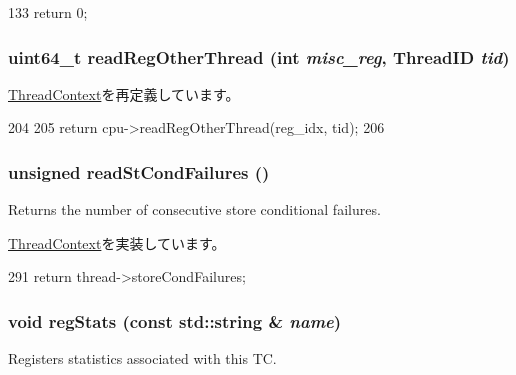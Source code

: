 \begin{DoxyCode}
133     { return 0; }
\end{DoxyCode}
\hypertarget{classInOrderThreadContext_a207d863e4bad4245020ea32adbaf625a}{
\subsubsection[{readRegOtherThread}]{\setlength{\rightskip}{0pt plus 5cm}uint64\_\-t readRegOtherThread (int {\em misc\_\-reg}, \/  {\bf ThreadID} {\em tid})}}
\label{classInOrderThreadContext_a207d863e4bad4245020ea32adbaf625a}


\hyperlink{classThreadContext_afcd73144c45c9fd2f36d55ea4c491505}{ThreadContext}を再定義しています。


\begin{DoxyCode}
204 {
205     return cpu->readRegOtherThread(reg_idx, tid);
206 }
\end{DoxyCode}
\hypertarget{classInOrderThreadContext_a25b995a791e41965e088d8bf3f2bf859}{
\subsubsection[{readStCondFailures}]{\setlength{\rightskip}{0pt plus 5cm}unsigned readStCondFailures ()}}
\label{classInOrderThreadContext_a25b995a791e41965e088d8bf3f2bf859}
Returns the number of consecutive store conditional failures. 

\hyperlink{classThreadContext_ab1bc64ec54c1cc47c9945fe68fa9e91c}{ThreadContext}を実装しています。


\begin{DoxyCode}
291     { return thread->storeCondFailures; }
\end{DoxyCode}
\hypertarget{classInOrderThreadContext_a3dd3443357312bcb75580eaa508c48a4}{
\subsubsection[{regStats}]{\setlength{\rightskip}{0pt plus 5cm}void regStats (const std::string \& {\em name})}}
\label{classInOrderThreadContext_a3dd3443357312bcb75580eaa508c48a4}
Registers statistics associated with this TC. 

